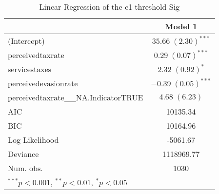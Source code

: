 
\begin{table}
\begin{tabular}{l c }
\hline
 & Model 1 \\
\hline
(Intercept)                          & $35.66 \; (2.30)^{***}$ \\
perceivedtaxrate                     & $0.29 \; (0.07)^{***}$  \\
servicestaxes                        & $2.32 \; (0.92)^{*}$    \\
perceivedevasionrate                 & $-0.39 \; (0.05)^{***}$ \\
perceivedtaxrate\_\_NA.IndicatorTRUE & $4.68 \; (6.23)$        \\
\hline
AIC                                  & 10135.34                \\
BIC                                  & 10164.96                \\
Log Likelihood                       & -5061.67                \\
Deviance                             & 1118969.77              \\
Num. obs.                            & 1030                    \\
\hline
\multicolumn{2}{l}{\scriptsize{$^{***}p<0.001$, $^{**}p<0.01$, $^*p<0.05$}}
\end{tabular}
\caption{Linear Regression of the c1 threshold Sig}
\label{table:coefficients}
\end{table}
